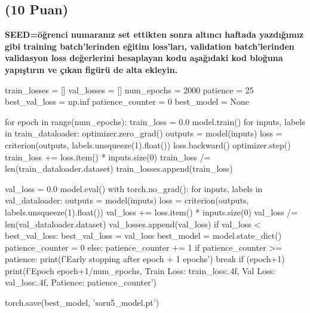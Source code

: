 \documentclass[11pt]{article}
\begin{document}
\subsection{(10 Puan)} \textbf{SEED=öğrenci numaranız set ettikten sonra altıncı haftada yazdığımız gibi training batch'lerinden eğitim loss'ları, validation batch'lerinden validasyon loss değerlerini hesaplayan kodu aşağıdaki kod bloğuna yapıştırın ve çıkan figürü de alta ekleyin.}

\begin{python}
train_losses = []
val_losses = []
num_epochs = 2000
patience = 25
best_val_loss = np.inf
patience_counter = 0
best_model = None

for epoch in range(num_epochs):
    train_loss = 0.0
    model.train()
    for inputs, labels in train_dataloader:
        optimizer.zero_grad()
        outputs = model(inputs)
        loss = criterion(outputs, labels.unsqueeze(1).float())
        loss.backward()
        optimizer.step()
        train_loss += loss.item() * inputs.size(0)
    train_loss /= len(train_dataloader.dataset)
    train_losses.append(train_loss)
    
    val_loss = 0.0
    model.eval()
    with torch.no_grad():
        for inputs, labels in val_dataloader:
            outputs = model(inputs)
            loss = criterion(outputs, labels.unsqueeze(1).float())
            val_loss += loss.item() * inputs.size(0)
        val_loss /= len(val_dataloader.dataset)
        val_losses.append(val_loss)
        if val_loss < best_val_loss:
            best_val_loss = val_loss
            best_model = model.state_dict()
            patience_counter = 0
        else:
            patience_counter += 1
            if patience_counter >= patience:
                print(f'Early stopping after {epoch + 1} epochs')
                break
    if (epoch+1) %
        print(f'Epoch {epoch+1}/{num_epochs}, Train Loss: {train_loss:.4f}, Val Loss: {val_loss:.4f}, Patience: {patience_counter}')

torch.save(best_model, 'soru5_model.pt')
\end{python}
\end{document}

